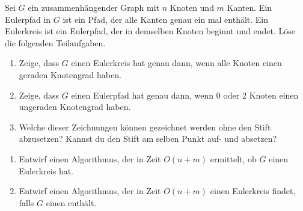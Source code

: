 \documentclass{uebung_cs}
\begin{document}
\begin{aufgabe}
	Sei $G$ ein zusammenhängender Graph mit $n$ Knoten und $m$ Kanten.
	Ein Eulerpfad in $G$ ist ein Pfad, der alle Kanten genau ein mal enthält.
	Ein Eulerkreis ist ein Eulerpfad, der in demselben Knoten beginnt und endet.
	Löse die folgenden Teilaufgaben.
	\begin{enumerate}
		\item \note %
    Zeige, dass $G$ einen Eulerkreis hat genau dann, wenn alle Knoten einen geraden Knotengrad haben.
		\item \note %
    Zeige, dass $G$ einen Eulerpfad hat genau dann, wenn 0 oder 2 Knoten einen ungeraden Knotengrad haben.
		\item \bestehen Welche dieser Zeichnungen können gezeichnet werden ohne den Stift abzusetzen?
		Kannst du den Stift am selben Punkt auf- und absetzen?
	\end{enumerate}
	\begin{center}
		\hspace{1.5cm}
		\hspace{1.5cm}
	\end{center}
	\begin{enumerate}[resume]
		\item \bestehen Entwirf einen Algorithmus, der in Zeit $O(n+m)$ ermittelt, ob $G$ einen Eulerkreis hat.
		\item \note %
    Entwirf einen Algorithmus, der in Zeit $O(n+m)$ einen Eulerkreis findet, falls $G$ einen enthält.
	\end{enumerate}	
\end{aufgabe}
\end{document}
